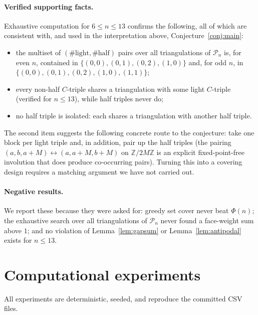 \documentclass[11pt,a4paper]{article}
\theoremstyle{definition}
\newcommand{\Pol}{\mathcal{P}}
\newcommand{\Zn}{\mathbb{Z}}
\begin{document}
\paragraph{Verified supporting facts.} Exhaustive computation for
$6 \le n \le 13$ confirms the following, all of which are consistent with, and
used in the interpretation above, Conjecture~\ref{conj:main}:
\begin{itemize}[leftmargin=1.4em]
\item the multiset of $(\#\text{light}, \#\text{half})$ pairs over all
      triangulations of $\Pol_n$ is, for even $n$, contained in
      $\{(0,0), (0,1), (0,2), (1,0)\}$ and, for odd $n$, in
      $\{(0,0), (0,1), (0,2), (1,0), (1,1)\}$;
\item every non-half $C$-triple shares a triangulation with some light
      $C$-triple (verified for $n \le 13$), while half triples never do;
\item no half triple is isolated: each shares a triangulation with another half
      triple.
\end{itemize}
The second item suggests the following concrete route to the conjecture: take one
block per light triple and, in addition, pair up the half triples (the pairing
$(a, b, a+M) \leftrightarrow (a, a+M, b+M)$ on $\Zn/2M\Zn$ is an explicit
fixed-point-free involution that does produce co-occurring pairs). Turning this
into a covering design requires a matching argument we have not carried out.

\paragraph{Negative results.} We report these because they were asked for:
greedy set cover never beat $\Phi(n)$; the exhaustive search over all
triangulations of $\Pol_n$ never found a face-weight sum above $1$; and no
violation of Lemma~\ref{lem:gapsum} or Lemma~\ref{lem:antipodal} exists for
$n \le 13$.

\section{Computational experiments}\label{sec:experiments}

All experiments are deterministic, seeded, and reproduce the committed CSV files.
\end{document}
